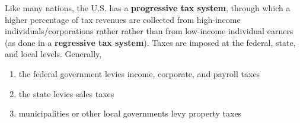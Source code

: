 \documentclass{article}
\begin{document}
  \begin{definition}
    Like many nations, the U.S. has a \textbf{progressive tax system}, through which a higher percentage of tax revenues are collected from high-income individuals/corporations rather rather than from low-income individual earners (as done in a \textbf{regressive tax system}). Taxes are imposed at the federal, state, and local levels. Generally, 
    \begin{enumerate}
      \item the federal government levies income, corporate, and payroll taxes
      \item the state levies sales taxes
      \item municipalities or other local governments levy property taxes
    \end{enumerate}
  \end{definition}
\end{document}
